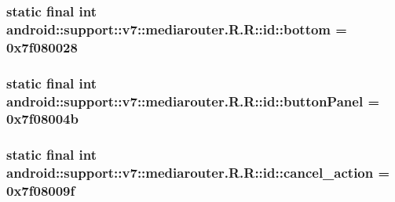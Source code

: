 \hypertarget{classandroid_1_1support_1_1v7_1_1mediarouter_1_1_r_1_1id_417bddcbb9a06a1c855296b3f37c5686}{
\subsubsection[{bottom}]{\setlength{\rightskip}{0pt plus 5cm}static final int android::support::v7::mediarouter.R.R::id::bottom = 0x7f080028}}
\label{classandroid_1_1support_1_1v7_1_1mediarouter_1_1_r_1_1id_417bddcbb9a06a1c855296b3f37c5686}


\hypertarget{classandroid_1_1support_1_1v7_1_1mediarouter_1_1_r_1_1id_acf58488a0ae2cd844d072e03cdc1fa3}{
\subsubsection[{buttonPanel}]{\setlength{\rightskip}{0pt plus 5cm}static final int android::support::v7::mediarouter.R.R::id::buttonPanel = 0x7f08004b}}
\label{classandroid_1_1support_1_1v7_1_1mediarouter_1_1_r_1_1id_acf58488a0ae2cd844d072e03cdc1fa3}


\hypertarget{classandroid_1_1support_1_1v7_1_1mediarouter_1_1_r_1_1id_403af49d9f2696113b1a9086877f4ac1}{
\subsubsection[{cancel\_\-action}]{\setlength{\rightskip}{0pt plus 5cm}static final int android::support::v7::mediarouter.R.R::id::cancel\_\-action = 0x7f08009f}}
\label{classandroid_1_1support_1_1v7_1_1mediarouter_1_1_r_1_1id_403af49d9f2696113b1a9086877f4ac1}


